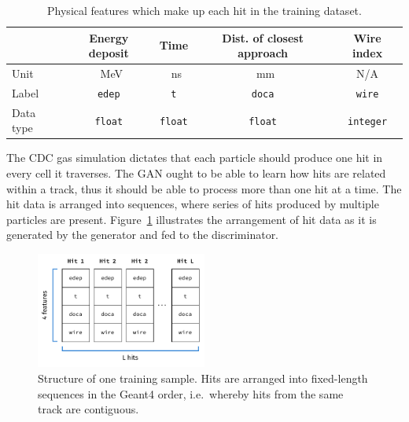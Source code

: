 \begin{table}
    \setlength{\tabcolsep}{12pt}
    \centering
    \begin{tabular}{l|cccc}
        \toprule
                  & \bfseries Energy deposit & \bfseries Time & \bfseries
                  Dist. of closest approach & \bfseries Wire index \\
        \midrule
        Unit      & \SI{}{\MeV}              & \SI{}{\ns}     & \SI{}{\mm}
        & N/A                  \\
        Label     & \texttt{edep}            & \texttt{t}     & \texttt{doca}
        & \texttt{wire}        \\
        Data type & \texttt{float}           & \texttt{float} & \texttt{float}
        & \texttt{integer} \\\bottomrule
    \end{tabular}
    \caption{Physical features which make up each hit in the training dataset.}
    \label{tab:gan_features}
\end{table}

The CDC gas simulation dictates that each particle should produce one hit in
every cell it traverses. The GAN ought to be able to learn how hits are related
within a track, thus it should be able to process more than one hit at a time.
The hit data is arranged into sequences, where series of hits produced by
multiple particles are present. Figure~\ref{fig:hit_data_structure} illustrates
the arrangement of hit data as it is generated by the generator and fed to the
discriminator.

\begin{figure}
    \centering
    \includegraphics[width=0.5\textwidth]{chapter4/hit_sequence.drawio.pdf}
    \caption{Structure of one training sample. Hits are arranged into
    fixed-length sequences in the {\sc Geant4} order, i.e.\ whereby hits from
    the same track are contiguous.}
    \label{fig:hit_data_structure}
\end{figure}



